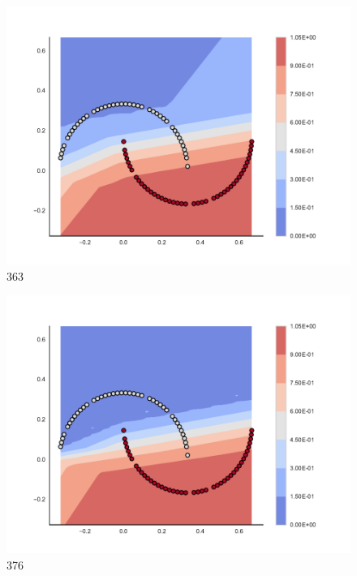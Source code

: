 \begin{subfigure}[b]{0.09\textwidth}
    \includegraphics[clip, trim=2.35cm 1.75cm 4.5cm 0cm,width=\textwidth]{img/convergence/363.pdf}
    \caption{363}
    \label{fig:convergence_363}
\end{subfigure}
%
\begin{subfigure}[b]{0.09\textwidth}
    \includegraphics[clip, trim=2.35cm 1.75cm 4.5cm 0cm,width=\textwidth]{img/convergence/376.pdf}
    \caption{376}
    \label{fig:convergence_376}
\end{subfigure}
%
